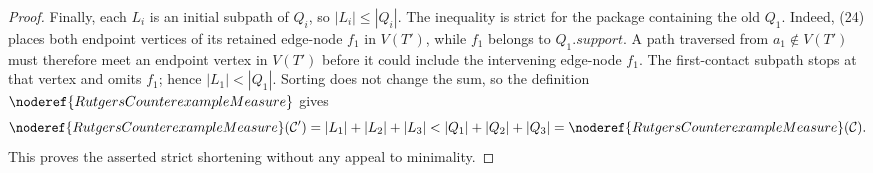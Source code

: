 \begin{proof}
Finally, each \(L_i\) is an initial subpath of \(Q_i\), so
\(|L_i|\le |Q_i|\).  The inequality is strict for the package containing
the old \(Q_1\).  Indeed, (24) places both endpoint vertices of its
retained edge-node \(f_1\) in \(V(T')\), while \(f_1\) belongs to
\(Q_1.\mathit{support}\).  A path traversed from \(a_1\notin V(T')\)
must therefore meet an endpoint vertex in \(V(T')\) before it could
include the intervening edge-node \(f_1\).  The first-contact subpath
stops at that vertex and omits \(f_1\); hence \(|L_1|<|Q_1|\).
Sorting does not change the sum, so the definition
\(\noderef{RutgersCounterexampleMeasure}\) gives
\[
 \noderef{RutgersCounterexampleMeasure}(\mathcal C')
   =|L_1|+|L_2|+|L_3|
   <|Q_1|+|Q_2|+|Q_3|
   =\noderef{RutgersCounterexampleMeasure}(\mathcal C).
\]
This proves the asserted strict shortening without any appeal to
minimality.
\end{proof}
